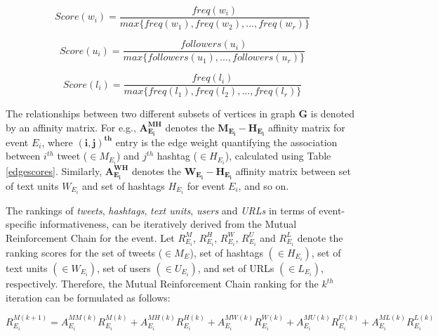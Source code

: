 \begin{equation}
Score(w_{i}) = \frac{freq(w_{i})}{max\{freq(w_{1}),freq(w_{2}),...,freq(w_{r})\}}
\end{equation}

\begin{equation}
Score(u_{i}) = \frac{followers(u_{i})}{max\{followers(u_{1}),...,followers(u_{r})\}}
\end{equation}

\begin{equation}
Score(l_{i}) = \frac{freq(l_{i})}{max\{freq(l_{1}),freq(l_{2}),...,freq(l_{r})\}}
\end{equation}


The relationships between two different subsets of vertices in graph $\scriptstyle \mathbf{G}$ is denoted by an affinity matrix. For e.g., $\mathbf{A_{E_{i}}^{MH}}$ denotes the $\mathbf{M_{E_{i}}-H_{E_{i}}}$ affinity matrix for event $E_{i}$, where $\mathbf{(i,j)^{th}}$ entry is the edge weight quantifying the association between $i^{th}$ tweet ($\in M_{E_{i}}$) and $j^{th}$ hashtag ($\in H_{E_{i}}$), calculated using Table \ref{edgescores}. Similarly, $\mathbf{A_{E_{i}}^{WH}}$ denotes the $\mathbf{W_{E_{i}}-H_{E_{i}}}$ affinity matrix between set of text units $W_{E_{i}}$ and set of hashtags $H_{E_{i}}$ for event $E_{i}$, and so on.


The rankings of \textit{tweets}, \textit{hashtags}, \textit{text units}, \textit{users} and \textit{URLs} in terms of event-specific informativeness, can be iteratively derived from the Mutual Reinforcement Chain for the event. Let $R_{{E_{i}}}^{M}$, $R_{{E_{i}}}^{H}$, $R_{{E_{i}}}^{W}$, $R_{{E_{i}}}^{U}$ and $\scriptstyle R_{{E_{i}}}^{L}$ denote the ranking scores for the set of tweets ($\in M_{E_{}}$), set of  hashtags $(\in H_{E_{i}})$, set of text units $(\in W_{E_{i}})$, set of users $(\in U_{E_{i}})$, and set of URLs $(\in L_{E_{i}})$, respectively. Therefore, the Mutual Reinforcement Chain ranking for the $k^{th}$ iteration can be formulated as follows:
 


\begin{equation}
R_{{E_{i}}}^{M(k+1)} = A_{E_{i}}^{MM(k)}R_{{E_{i}}}^{M(k)} + A_{E_{i}}^{MH(k)}R_{{E_{i}}}^{H(k)} + A_{E_{i}}^{MW(k)}R_{{E_{i}}}^{W(k)}+ A_{E_{i}}^{MU(k)}R_{{E_{i}}}^{U(k)} + A_{E_{i}}^{ML(k)}R_{{E_{i}}}^{L(k)}
\end{equation}

